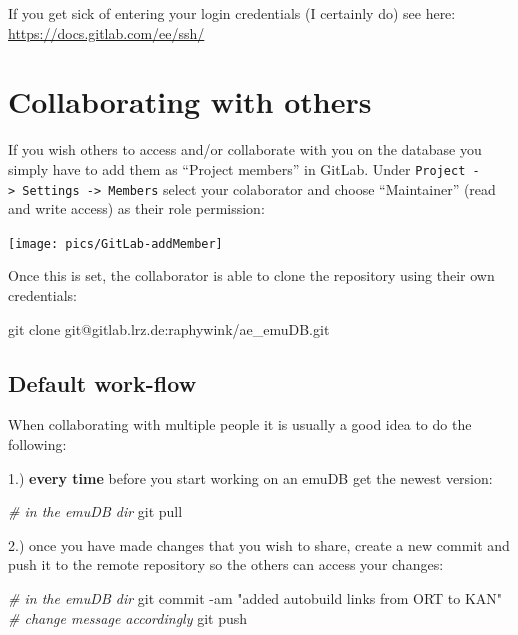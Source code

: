 \documentclass[]{book}
\newenvironment{Shaded}{\begin{snugshade}}{\end{snugshade}}
\newcommand{\CommentTok}[1]{\textcolor[rgb]{0.56,0.35,0.01}{\textit{#1}}}
\newcommand{\FunctionTok}[1]{\textcolor[rgb]{0.00,0.00,0.00}{#1}}
\newcommand{\NormalTok}[1]{#1}
\newcommand{\StringTok}[1]{\textcolor[rgb]{0.31,0.60,0.02}{#1}}
\begin{document}
If you get sick of entering your login credentials (I certainly do) see here: \url{https://docs.gitlab.com/ee/ssh/}

\hypertarget{collaborating-with-others}{%
\section{Collaborating with others}\label{collaborating-with-others}}

If you wish others to access and/or collaborate with you on the database you simply have to add them as ``Project members'' in GitLab. Under \texttt{Project\ -\textgreater{}\ Settings\ -\textgreater{}\ Members} select your colaborator and choose ``Maintainer'' (read and write access) as their role permission:

\begin{center}\texttt{[image: pics/GitLab-addMember]} \end{center}

Once this is set, the collaborator is able to clone the repository using their own credentials:

\begin{Shaded}
\begin{Highlighting}[]
\FunctionTok{git}\NormalTok{ clone git@gitlab.lrz.de:raphywink/ae_emuDB.git}
\end{Highlighting}
\end{Shaded}

\hypertarget{default-work-flow}{%
\subsection{Default work-flow}\label{default-work-flow}}

When collaborating with multiple people it is usually a good idea to do the following:

1.) \textbf{every time} before you start working on an emuDB get the newest version:

\begin{Shaded}
\begin{Highlighting}[]
\CommentTok{# in the emuDB dir}
\FunctionTok{git}\NormalTok{ pull}
\end{Highlighting}
\end{Shaded}

2.) once you have made changes that you wish to share, create a new commit and push it to the remote repository so the others can access your changes:

\begin{Shaded}
\begin{Highlighting}[]
\CommentTok{# in the emuDB dir}
\FunctionTok{git}\NormalTok{ commit -am }\StringTok{"added autobuild links from ORT to KAN"} \CommentTok{# change message accordingly}
\FunctionTok{git}\NormalTok{ push}
\end{Highlighting}
\end{Shaded}


\end{document}
